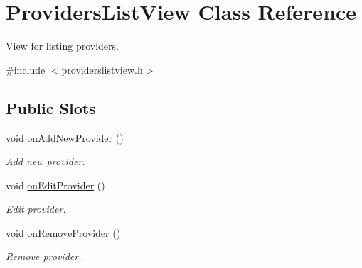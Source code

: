 \hypertarget{class_providers_list_view}{\section{\-Providers\-List\-View \-Class \-Reference}
\label{class_providers_list_view}
}


\-View for listing providers.  




{\ttfamily \#include $<$providerslistview.\-h$>$}

\subsection*{\-Public \-Slots}
\begin{DoxyCompactItemize}
\item 
void \hyperlink{class_providers_list_view_a8de30515daeeb65d8040d93faf757174}{on\-Add\-New\-Provider} ()
\begin{DoxyCompactList}\small\item\em \-Add new provider. \end{DoxyCompactList}\item 
void \hyperlink{class_providers_list_view_a0c369cb7b865d28f3318f256e130a85a}{on\-Edit\-Provider} ()
\begin{DoxyCompactList}\small\item\em \-Edit provider. \end{DoxyCompactList}\item 
void \hyperlink{class_providers_list_view_aaa7e6e3e6d2d6ca455dc5c782bb01897}{on\-Remove\-Provider} ()
\begin{DoxyCompactList}\small\item\em \-Remove provider. \end{DoxyCompactList}\end{DoxyCompactItemize}
